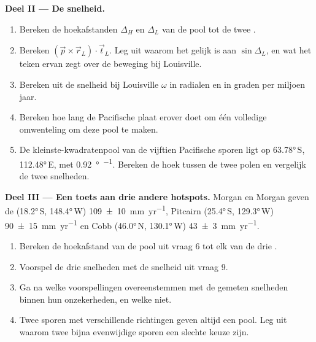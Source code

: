 \begin{problem}
\medskip
\noindent\textbf{Deel II --- De snelheid.}
\begin{enumerate}[resume]
  \item Bereken de hoekafstanden $\Delta_H$ en $\Delta_L$ van de pool
        tot de twee .
  \item Bereken $(\vec p\times\vec r_L)\cdot\vec t_L$. Leg uit waarom het gelijk is aan
        $\sin\Delta_L$, en wat het teken ervan zegt over de beweging bij Louisville.
  \item Bereken uit de snelheid bij Louisville $\omega$ in radialen en in
        graden per miljoen jaar.
  \item Bereken hoe lang de Pacifische plaat erover doet om één volledige
        omwenteling om deze pool te maken.
  \item De kleinste-kwadratenpool van de vijftien Pacifische sporen ligt op
        \ang{63.78}\,S, \ang{112.48}\,E, met \qty{0.92}{\degree\per\Myr}.
        Bereken de hoek tussen de twee polen en vergelijk de twee snelheden.
\end{enumerate}

\medskip
\noindent\textbf{Deel III --- Een toets aan drie andere hotspots.} Morgan en
Morgan geven de  (\ang{18.2}\,S, \ang{148.4}\,W)
\qty[uncertainty-mode=separate]{109 \pm 10}{mm.yr^{-1}}, Pitcairn
(\ang{25.4}\,S, \ang{129.3}\,W)
\qty[uncertainty-mode=separate]{90 \pm 15}{mm.yr^{-1}} en Cobb
(\ang{46.0}\,N, \ang{130.1}\,W)
\qty[uncertainty-mode=separate]{43 \pm 3}{mm.yr^{-1}}.
\begin{enumerate}[resume]
  \item Bereken de hoekafstand van de pool uit vraag 6 tot elk van de
        drie .
  \item Voorspel de drie snelheden met de snelheid uit vraag 9.
  \item Ga na welke voorspellingen overeenstemmen met de gemeten snelheden binnen
        hun onzekerheden, en welke niet.
  \item Twee sporen met verschillende richtingen geven altijd een pool. Leg uit waarom
        twee bijna evenwijdige sporen een slechte keuze zijn.
\end{enumerate}


\end{problem}
